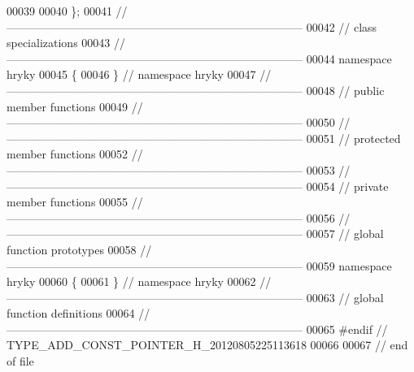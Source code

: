 \begin{DoxyCode}
00039 
00040 \};
00041 \textcolor{comment}{//
      ------------------------------------------------------------------------------}
00042 \textcolor{comment}{// class specializations}
00043 \textcolor{comment}{//
      ------------------------------------------------------------------------------}
00044 \textcolor{keyword}{namespace }hryky
00045 \{
00046 \} \textcolor{comment}{// namespace hryky}
00047 \textcolor{comment}{//
      ------------------------------------------------------------------------------}
00048 \textcolor{comment}{// public member functions}
00049 \textcolor{comment}{//
      ------------------------------------------------------------------------------}
00050 \textcolor{comment}{//
      ------------------------------------------------------------------------------}
00051 \textcolor{comment}{// protected member functions}
00052 \textcolor{comment}{//
      ------------------------------------------------------------------------------}
00053 \textcolor{comment}{//
      ------------------------------------------------------------------------------}
00054 \textcolor{comment}{// private member functions}
00055 \textcolor{comment}{//
      ------------------------------------------------------------------------------}
00056 \textcolor{comment}{//
      ------------------------------------------------------------------------------}
00057 \textcolor{comment}{// global function prototypes}
00058 \textcolor{comment}{//
      ------------------------------------------------------------------------------}
00059 \textcolor{keyword}{namespace }hryky
00060 \{
00061 \} \textcolor{comment}{// namespace hryky}
00062 \textcolor{comment}{//
      ------------------------------------------------------------------------------}
00063 \textcolor{comment}{// global function definitions}
00064 \textcolor{comment}{//
      ------------------------------------------------------------------------------}
00065 \textcolor{preprocessor}{#endif // TYPE\_ADD\_CONST\_POINTER\_H\_20120805225113618}
00066 \textcolor{preprocessor}{}
00067 \textcolor{comment}{// end of file}
\end{DoxyCode}
